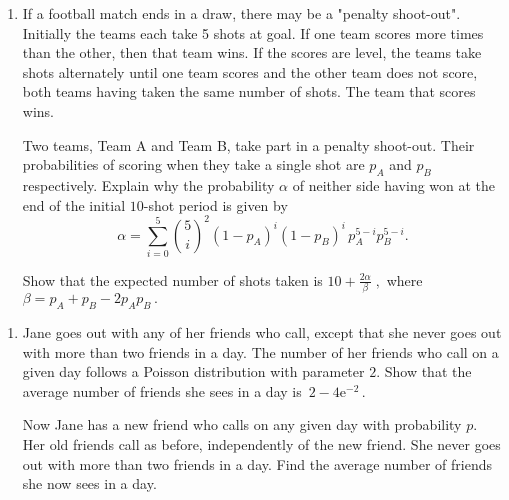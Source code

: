 \documentclass[a4, 11pt]{report}
\newlength{\qspace}
\newcounter{qnumber}
\newenvironment{question}%
 {\vspace{\qspace}
  \begin{enumerate}[\bfseries 1\quad][10]%
    \setcounter{enumi}{\value{qnumber}}%
    \item%
 }
{
  \end{enumerate}
  \filbreak
  \stepcounter{qnumber}
 }
\def\e{{\mathrm e}}
\newcommand{\ds}{\displaystyle}
\begin{document}
\begin{question}
If a football match ends in a draw, 
there may be a "penalty shoot-out". Initially the 
teams each take 5 shots at
goal. If one team scores more times than the other, 
then that team wins. If the scores are level, the
teams take shots alternately until 
one team scores and the other team does not score,
both teams having taken the same number of shots. The team that scores wins.

Two teams, Team A and Team B, take part in a penalty shoot-out.
Their probabilities of  scoring when they take a single 
shot are  $p_A$ and $p_B$ respectively.
Explain why the
probability $\alpha$  of neither side having won at the end of the 
initial $10$-shot  period is given by
$$\alpha =\sum_{i=0}^5\binom{5}{i}^2(1-p_A)^i(1-p_B)^i\,p_A^{5-i}p_B^{5-i}.$$


Show that the expected number of shots  taken is 
$\ds10+ \frac{2\alpha}\beta\;,$ 
where
$\beta=p_A+p_B-2p_Ap_B\,.$
\end{question}

\begin{question}
 Jane goes out with any of her friends 
who call, except that she never  goes out with more
than two friends in a day. The number of her friends who call
on a given day follows  a Poisson distribution with parameter $2$.
Show that the average number of friends she sees in a day is~$2-4\e^{-2}\,$.

Now Jane has a new friend who calls on any given day with 
probability $p$. Her old friends call as before, independently
of the new friend.  She never  goes out with more
than two friends in a day. Find the average  number of friends she now
sees in a day.
\end{question}
	
\end{document}
